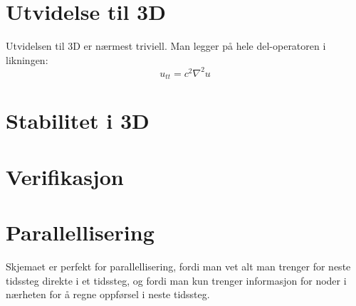 \documentclass[a4paper, 10pt]{article}
\begin{document}
\section{Utvidelse til 3D}
Utvidelsen til 3D er nærmest triviell. Man legger på hele del-operatoren i likningen:
\begin{equation}
	u_{tt} = c^2 \nabla^2 u
\end{equation}

\section{Stabilitet i 3D}

\section{Verifikasjon}


\section{Parallellisering}
Skjemaet er perfekt for parallellisering, fordi man vet alt man trenger for neste tidssteg direkte i et tidssteg, og fordi man kun trenger informasjon for noder i nærheten for å regne oppførsel i neste tidssteg. 
\end{document}

